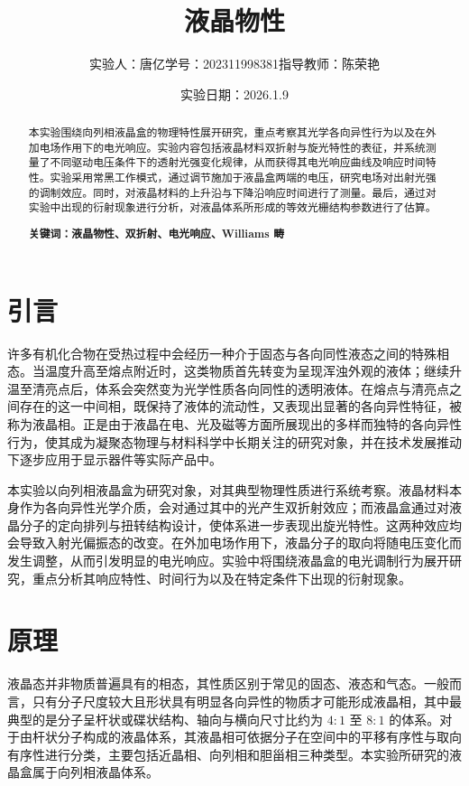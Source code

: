 \documentclass[a4paper, 1.5lines]{ctexart}
\title{液晶物性}
\author{实验人：唐亿\qquad 学号：202311998381\qquad 指导教师：陈荣艳}
\date{实验日期：2026.1.9}
\begin{document}
    
    \maketitle
            
    \begin{abstract}
         本实验围绕向列相液晶盒的物理特性展开研究，重点考察其光学各向异性行为以及在外加电场作用下的电光响应。实验内容包括液晶材料双折射与旋光特性的表征，并系统测量了不同驱动电压条件下的透射光强变化规律，从而获得其电光响应曲线及响应时间特性。实验采用常黑工作模式，通过调节施加于液晶盒两端的电压，研究电场对出射光强的调制效应。同时，对液晶材料的上升沿与下降沿响应时间进行了测量。最后，通过对实验中出现的衍射现象进行分析，对液晶体系所形成的等效光栅结构参数进行了估算。
        
        \textbf{\textbf{关键词：液晶物性、双折射、电光响应、Williams 畴}}
    \end{abstract}
    
    \section{引言}
        许多有机化合物在受热过程中会经历一种介于固态与各向同性液态之间的特殊相态。当温度升高至熔点附近时，这类物质首先转变为呈现浑浊外观的液体；继续升温至清亮点后，体系会突然变为光学性质各向同性的透明液体。在熔点与清亮点之间存在的这一中间相，既保持了液体的流动性，又表现出显著的各向异性特征，被称为液晶相。正是由于液晶在电、光及磁等方面所展现出的多样而独特的各向异性行为，使其成为凝聚态物理与材料科学中长期关注的研究对象，并在技术发展推动下逐步应用于显示器件等实际产品中。

本实验以向列相液晶盒为研究对象，对其典型物理性质进行系统考察。液晶材料本身作为各向异性光学介质，会对通过其中的光产生双折射效应；而液晶盒通过对液晶分子的定向排列与扭转结构设计，使体系进一步表现出旋光特性。这两种效应均会导致入射光偏振态的改变。在外加电场作用下，液晶分子的取向将随电压变化而发生调整，从而引发明显的电光响应。实验中将围绕液晶盒的电光调制行为展开研究，重点分析其响应特性、时间行为以及在特定条件下出现的衍射现象。
    \section{原理}
       液晶态并非物质普遍具有的相态，其性质区别于常见的固态、液态和气态。一般而言，只有分子尺度较大且形状具有明显各向异性的物质才可能形成液晶相，其中最典型的是分子呈杆状或碟状结构、轴向与横向尺寸比约为 $4{:}1$ 至 $8{:}1$ 的体系。对于由杆状分子构成的液晶体系，其液晶相可依据分子在空间中的平移有序性与取向有序性进行分类，主要包括近晶相、向列相和胆甾相三种类型。本实验所研究的液晶盒属于向列相液晶体系。
\end{document}
